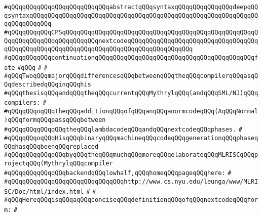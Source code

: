 \verb|#qQQqqQQqqQQqqQQqqQQqqQQqqQQqabstractqQQqsyntaxqQQqqQQqqQQqqQQqdeepqQQqsyntaxqQQqqQQqqQQqqQQqqQQqqQQqqQQqqQQqqQQqqQQqqQQqqQQqqQQqqQQqqQQqqQQqqQQqqQQqqQQq|\newline
\verb|#qQQqqQQqqQQqCPSqQQqqQQqqQQqqQQqqQQqqQQqqQQqqQQqqQQqqQQqqQQqqQQqqQQqqQQqqQQqqQQqqQQqqQQqqQQqqQQqnextcodeqQQqqQQqqQQqqQQqqQQqqQQqqQQqqQQqqQQqqQQqqQQqqQQqqQQqqQQqqQQqqQQqqQQqqQQqqQQqqQQqqQQqqQQq|\newline
\verb|#qQQqqQQqqQQqcontinuationqQQqqQQqqQQqqQQqqQQqqQQqqQQqqQQqqQQqqQQqqQQqfate|\newline
\verb|#qQQq|\newline
\verb|#|\newline
\verb|#|\newline
\verb|#qQQqTwoqQQqmajorqQQqdifferencesqQQqbetweenqQQqtheqQQqcompilerqQQqasqQQqdescribedqQQqinqQQqhis|\newline
\verb|#qQQqthesisqQQqandqQQqtheqQQqcurrentqQQqMythrylqQQq(andqQQqSML/NJ)qQQqcompilers:|\newline
\verb|#|\newline
\verb|#qQQqqQQqoqQQqTheqQQqadditionqQQqofqQQqanqQQqanormcodeqQQq(AqQQqNormal)qQQqformqQQqpassqQQqbetween|\newline
\verb|#qQQqqQQqqQQqqQQqtheqQQqlambdacodeqQQqandqQQqnextcodeqQQqphases.|\newline
\verb|#|\newline
\verb|#qQQqqQQqoqQQqHisqQQqbinaryqQQqmachineqQQqcodeqQQqgenerationqQQqphaseqQQqhasqQQqbeenqQQqreplaced|\newline
\verb|#qQQqqQQqqQQqqQQqbyqQQqtheqQQqmuchqQQqmoreqQQqelaborateqQQqMLRISCqQQqprojectqQQq(MythrylqQQqcompiler|\newline
\verb|#qQQqqQQqqQQqqQQqbackendqQQqlowhalf,qQQqhomeqQQqpageqQQqhere:|\newline
\verb|#|\newline
\verb|#qQQqqQQqqQQqqQQqqQQqqQQqqQQqqQQqhttp://www.cs.nyu.edu/leunga/www/MLRISC/Doc/html/index.html|\newline
\verb|#|\newline
\verb|#|\newline
\verb|#qQQqHereqQQqisqQQqaqQQqconciseqQQqdefinitionqQQqofqQQqnextcodeqQQqform:|\newline
\verb|#|\newline
